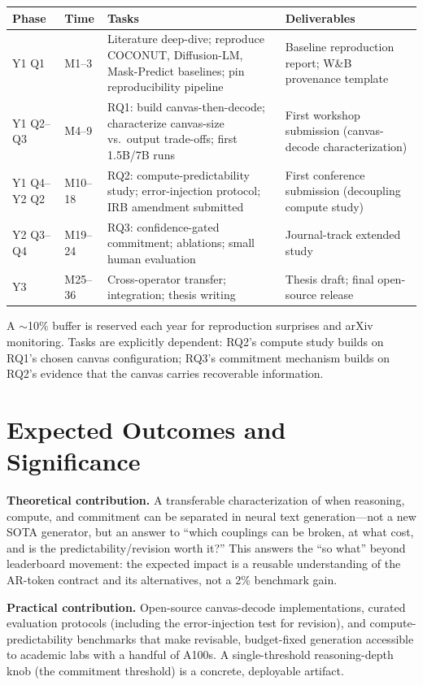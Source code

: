 \documentclass[11pt,a4paper]{article}
\begin{document}
\begin{table}[h]
\centering\small
\begin{tabularx}{\textwidth}{l l X X}
\toprule
\textbf{Phase} & \textbf{Time} & \textbf{Tasks} & \textbf{Deliverables} \\
\midrule
Y1 Q1 & M1--3 & Literature deep-dive; reproduce COCONUT, Diffusion-LM, Mask-Predict baselines; pin reproducibility pipeline & Baseline reproduction report; W\&B provenance template \\
Y1 Q2--Q3 & M4--9 & RQ1: build canvas-then-decode; characterize canvas-size vs.\ output trade-offs; first 1.5B/7B runs & First workshop submission (canvas-decode characterization) \\
Y1 Q4--Y2 Q2 & M10--18 & RQ2: compute-predictability study; error-injection protocol; IRB amendment submitted & First conference submission (decoupling compute study) \\
Y2 Q3--Q4 & M19--24 & RQ3: confidence-gated commitment; ablations; small human evaluation & Journal-track extended study \\
Y3 & M25--36 & Cross-operator transfer; integration; thesis writing & Thesis draft; final open-source release \\
\bottomrule
\end{tabularx}
\end{table}

A $\sim$10\% buffer is reserved each year for reproduction surprises and arXiv monitoring. Tasks are explicitly dependent: RQ2's compute study builds on RQ1's chosen canvas configuration; RQ3's commitment mechanism builds on RQ2's evidence that the canvas carries recoverable information.

\section{Expected Outcomes and Significance}

\textbf{Theoretical contribution.} A transferable characterization of when reasoning, compute, and commitment can be separated in neural text generation---not a new SOTA generator, but an answer to ``which couplings can be broken, at what cost, and is the predictability/revision worth it?'' This answers the ``so what'' beyond leaderboard movement: the expected impact is a reusable understanding of the AR-token contract and its alternatives, not a 2\% benchmark gain.

\textbf{Practical contribution.} Open-source canvas-decode implementations, curated evaluation protocols (including the error-injection test for revision), and compute-predictability benchmarks that make revisable, budget-fixed generation accessible to academic labs with a handful of A100s. A single-threshold reasoning-depth knob (the commitment threshold) is a concrete, deployable artifact.
\end{document}
